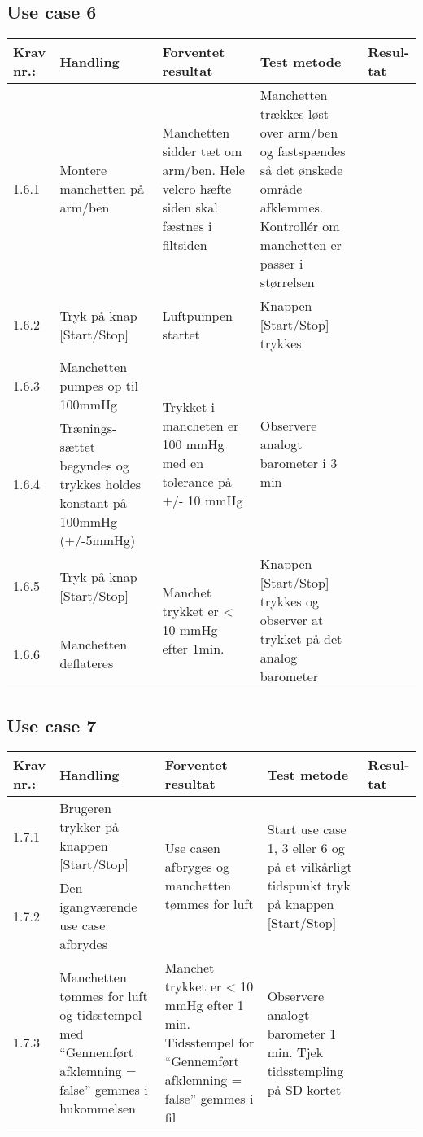 \documentclass[11pt]{article}
\begin{document}
						\subsection{Use case 6}
						\begin{center}
							\begin{longtable}{|p{1.5cm}|p{2cm}|p{3cm}|p{3cm}|p{1.1cm}|}
								\hline
								Krav nr.: & Handling & Forventet resultat & Test metode & Resul-tat  \\\hline
								1.6.1 & Montere manchetten på arm/ben & Manchetten sidder tæt om arm/ben. Hele velcro hæfte siden skal fæstnes i filtsiden & Manchetten trækkes løst over arm/ben og fastspændes så det ønskede område afklemmes. Kontrollér om manchetten er passer i størrelsen & \\ \hline
								1.6.2 & Tryk på knap [Start/Stop] & Luftpumpen startet & Knappen [Start/Stop] trykkes & \\ \hline
								1.6.3 & Manchetten pumpes op til 100mmHg & \multirow{2}{3cm}{Trykket i mancheten er 100 mmHg med en tolerance på +/- 10 mmHg}& \multirow{2}{3cm}{Observere analogt barometer i 3 min}& \multirow{2}{3cm}{} \\ \cline{1-2}
								1.6.4 & Trænings-sættet begyndes og trykkes holdes konstant på 100mmHg (+/-5mmHg) & & & \\ \hline
								1.6.5 & Tryk på knap [Start/Stop]  & \multirow{2}{3cm}{Manchet trykket er < 10 mmHg efter 1min.} & \multirow{2}{3cm}{Knappen [Start/Stop] trykkes og observer at trykket på det analog barometer} & \multirow{2}{3cm}{} \\ [2cm] \cline{1-2}
								1.6.6 & Manchetten deflateres  & & & \\ \hline
							\end{longtable}
						\end{center}
						
					
					\subsection{Use case 7}
					\begin{center}
						\begin{longtable}{|p{1.5cm}|p{2cm}|p{3cm}|p{3cm}|p{1.1cm}|}
							\hline
							Krav nr.: & Handling & Forventet resultat & Test metode & Resul-tat  \\\hline
							1.7.1 & Brugeren trykker på knappen [Start/Stop] & \multirow{2}{3cm}{Use casen afbryges og manchetten tømmes for luft} & \multirow{2}{3cm}{Start use case 1, 3 eller 6 og på et vilkårligt tidspunkt tryk på knappen [Start/Stop]} & \multirow{2}{3cm}{} \\ \cline{1-2}
							1.7.2 & Den igangværende use case afbrydes & & & \\ \hline
							1.7.3 & Manchetten tømmes for luft og tidsstempel med “Gennemført afklemning = false” gemmes i hukommelsen & Manchet trykket er < 10 mmHg efter 1 min. Tidsstempel for  “Gennemført afklemning = false” gemmes i fil & Observere analogt barometer 1 min.
							Tjek tidsstempling på SD kortet & \\ \hline
						\end{longtable}
					\end{center}
					
\end{document}
